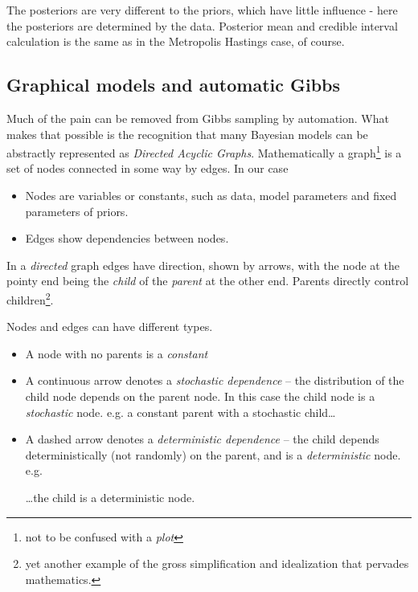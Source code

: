 \documentclass[10pt] {article}
\newcommand{\eps}[3]
{{\begin{center}
 \rotatebox{#1}{\scalebox{#2}{\texttt{[image: \#3]}}}
 \end{center}}
}
\theoremstyle{definition}
\begin{document}
\noindent The posteriors are very different to the priors, which have little influence - here the posteriors are determined by the data. Posterior mean and credible interval calculation is the same as in the Metropolis Hastings case, of course. 


\subsection{Graphical models and automatic Gibbs \label{sec:dag}}

Much of the pain can be removed from Gibbs sampling by automation. What makes that possible is the recognition that many Bayesian models can be abstractly represented as {\em Directed Acyclic Graphs}. Mathematically a graph\footnote{not to be confused with a {\em plot}} is a set of nodes connected in some way by edges. In our case 
\begin{itemize}
\item Nodes are variables or constants, such as data, model parameters and fixed parameters of priors.
\item Edges show dependencies between nodes.  
\end{itemize}
In a {\em directed} graph edges have direction, shown by arrows, with the node at the pointy end being the {\em child} of the {\em parent} at the other end. Parents directly control children\footnote{yet another example of the gross simplification and idealization that pervades mathematics.}. 

\eps{-90}{.4}{pc-dag.eps}

\noindent Nodes and edges can have different types.
\begin{itemize} 
\item A node with no parents is a {\em constant}
\item A continuous arrow denotes a {\em stochastic dependence} -- the distribution of the child node depends on the parent node. In this case the child node is a {\em stochastic} node. e.g. a constant parent with a stochastic child\ldots
\eps{-90}{.4}{pc-dag.eps}
\item A dashed arrow denotes a {\em deterministic dependence} -- the child depends deterministically (not randomly) on the parent, and is a {\em deterministic} node. e.g.
\eps{-90}{.4}{stoch-dag.eps}
\ldots the child is a deterministic node.  
\end{itemize}
\end{document}
